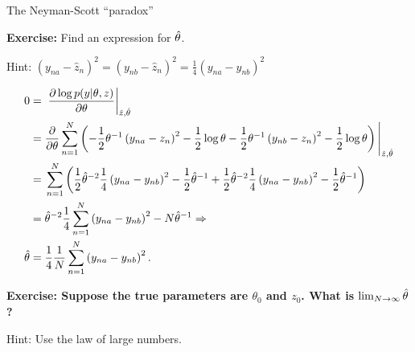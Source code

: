 \begin{frame}{The Neyman-Scott ``paradox''}

\textbf{Exercise:} Find an expression for $\hat\theta$.

Hint:
%
$%
\left( y_{na}  - \hat{z}_n\right)^2 =
\left( y_{nb}  - \hat{z}_n\right)^2 =
\frac{1}{4} \left( y_{na}  - y_{nb}\right)^2
%
$
%

\begin{align*}
%
0 ={}& \fracat{\partial \log p(y | \theta, z)}{\partial \theta}{\hat{z}, \thetahat} \\
={}& \frac{\partial}{\partial \theta}
\sumn
\left(
-\frac{1}{2} \theta^{-1} \left( y_{na}  - z_n\right)^2 - \frac{1}{2}\log \theta
-\frac{1}{2} \theta^{-1} \left( y_{nb}  - z_n\right)^2 - \frac{1}{2}\log \theta
\right)
\Bigg|_{\hat{z}, \thetahat}\\
={}&
\sumn
\left(
\frac{1}{2} \thetahat^{-2} \frac{1}{4} \left( y_{na}  - y_{nb}\right)^2 - \frac{1}{2}\thetahat^{-1} +
\frac{1}{2} \thetahat^{-2} \frac{1}{4} \left( y_{na}  - y_{nb}\right)^2 - \frac{1}{2}\thetahat^{-1}
\right)
\\={}&
\thetahat^{-2} \frac{1}{4} \sumn \left( y_{na}  - y_{nb}\right)^2 - N \thetahat^{-1}
\Rightarrow \\
\thetahat ={}& \frac{1}{4} \meann \left( y_{na}  - y_{nb}\right)^2.
%
\end{align*}

\pause
\textbf{Exercise:
Suppose the true parameters are $\theta_0$ and $z_0$.  What is $\lim_{N\rightarrow\infty} \hat\theta$?}

Hint: Use the law of large numbers.

\end{frame}




